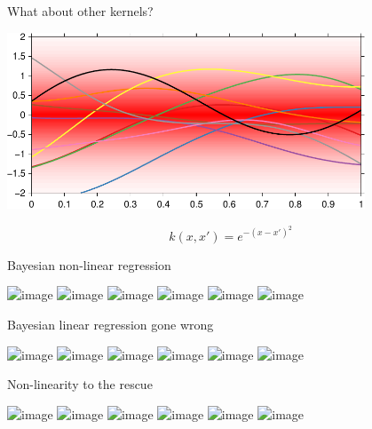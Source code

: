 \begin{frame}{What about other kernels?}
  \begin{center}
    \includegraphics[width=0.8\textwidth]{figures/lin_reg/sq_exp_prior}
  \end{center}
  \begin{equation*}
    k(x, x') = e^{-(x-x')^2}
  \end{equation*}
\end{frame}

\begin{frame}{Bayesian non-linear regression}
  \begin{center}
    \includegraphics<1>[width=0.8\textwidth]{figures/lin_reg/sq_exp_1}
    \includegraphics<2>[width=0.8\textwidth]{figures/lin_reg/sq_exp_2}
    \includegraphics<3>[width=0.8\textwidth]{figures/lin_reg/sq_exp_3}
    \includegraphics<4>[width=0.8\textwidth]{figures/lin_reg/sq_exp_5}
    \includegraphics<5>[width=0.8\textwidth]{figures/lin_reg/sq_exp_10}
    \includegraphics<6>[width=0.8\textwidth]{figures/lin_reg/sq_exp_15}
  \end{center}
\end{frame}

\begin{frame}{Bayesian linear regression gone wrong}
  \begin{center}
    \includegraphics<1>[width=0.8\textwidth]{figures/quad/bayes_1}
    \includegraphics<2>[width=0.8\textwidth]{figures/quad/bayes_2}
    \includegraphics<3>[width=0.8\textwidth]{figures/quad/bayes_3}
    \includegraphics<4>[width=0.8\textwidth]{figures/quad/bayes_5}
    \includegraphics<5>[width=0.8\textwidth]{figures/quad/bayes_10}
    \includegraphics<6>[width=0.8\textwidth]{figures/quad/bayes_15}
  \end{center}
\end{frame}

\begin{frame}{Non-linearity to the rescue}
  \begin{center}
    \includegraphics<1>[width=0.8\textwidth]{figures/quad/sq_exp_1}
    \includegraphics<2>[width=0.8\textwidth]{figures/quad/sq_exp_2}
    \includegraphics<3>[width=0.8\textwidth]{figures/quad/sq_exp_3}
    \includegraphics<4>[width=0.8\textwidth]{figures/quad/sq_exp_5}
    \includegraphics<5>[width=0.8\textwidth]{figures/quad/sq_exp_10}
    \includegraphics<6>[width=0.8\textwidth]{figures/quad/sq_exp_15}
  \end{center}
\end{frame}

